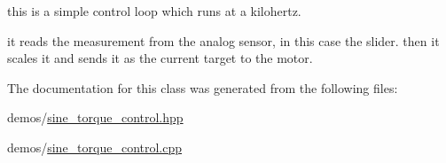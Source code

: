 this is a simple control loop which runs at a kilohertz. 

it reads the measurement from the analog sensor, in this case the slider. then it scales it and sends it as the current target to the motor. 

The documentation for this class was generated from the following files\+:\begin{DoxyCompactItemize}
\item 
demos/\hyperlink{sine__torque__control_8hpp}{sine\+\_\+torque\+\_\+control.\+hpp}\item 
demos/\hyperlink{sine__torque__control_8cpp}{sine\+\_\+torque\+\_\+control.\+cpp}\end{DoxyCompactItemize}
